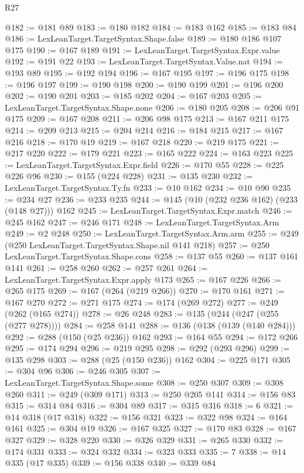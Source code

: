 \begin{lexlean}{R27}
\begin{coremodule}
@182 := @181 @89
@183 := @180 @182
@184 := @183 @162
@185 := @183 @84
@186 := LexLeanTarget.TargetSyntax.Shape.false
@189 := @180 @186 @107 @175
@190 := @167 @189
@191 := LexLeanTarget.TargetSyntax.Expr.value
@192 := @191 @22
@193 := LexLeanTarget.TargetSyntax.Value.nat
@194 := @193 @89
@195 := @192 @194
@196 := @167 @195
@197 := @196 @175
@198 := @196 @197
@199 := @190 @198
@200 := @190 @199
@201 := @196 @200
@202 := @190 @201
@203 := @185 @202
@204 := @167 @203
@205 := LexLeanTarget.TargetSyntax.Shape.none
@206 := @180 @205
@208 := @206 @91 @175
@209 := @167 @208
@211 := @206 @98 @175
@213 := @167 @211 @175
@214 := @209 @213
@215 := @204 @214
@216 := @184 @215
@217 := @167 @216
@218 := @170 @19
@219 := @167 @218
@220 := @219 @175
@221 := @217 @220
@222 := @179 @221
@223 := @165 @222
@224 := @163 @223
@225 := LexLeanTarget.TargetSyntax.Expr.field
@226 := @170 @55
@228 := @225 @226 @96
@230 := @155 (@224 @228)
@231 := @135 @230
@232 := LexLeanTarget.TargetSyntax.Ty.fn
@233 := @10 @162
@234 := @10 @90
@235 := @234 @27
@236 := @233 @235
@244 := @145 (@10 (@232 @236 @162) (@233 (@148 @27))) @162
@245 := LexLeanTarget.TargetSyntax.Expr.match
@246 := @245 @162
@247 := @246 @171
@248 := LexLeanTarget.TargetSyntax.Arm
@249 := @2 @248
@250 := LexLeanTarget.TargetSyntax.Arm.arm
@255 := @249 (@250 LexLeanTarget.TargetSyntax.Shape.nil @141 @218)
@257 := @250 LexLeanTarget.TargetSyntax.Shape.cons
@258 := @137 @55
@260 := @137 @161 @141
@261 := @258 @260
@262 := @257 @261
@264 := LexLeanTarget.TargetSyntax.Expr.apply @173
@265 := @167 @226
@266 := @265 @175
@269 := @167 (@264 (@219 @266))
@270 := @170 @161
@271 := @167 @270
@272 := @271 @175
@274 := @174 (@269 @272)
@277 := @249 (@262 (@165 @274))
@278 := @26 @248
@283 := @135 (@244 (@247 (@255 (@277 @278))))
@284 := @258 @141
@288 := @136 (@138 (@139 (@140 @284)))
@292 := @288 (@150 (@25 @236)) @162
@293 := @164 @55
@294 := @172 @266
@295 := @174 @294
@296 := @219 @295
@298 := @292 (@293 @296)
@299 := @135 @298
@303 := @288 (@25 (@150 @236)) @162
@304 := @225 @171
@305 := @304 @96
@306 := @246 @305
@307 := LexLeanTarget.TargetSyntax.Shape.some
@308 := @250 @307
@309 := @308 @260
@311 := @249 (@309 @171)
@313 := @250 @205 @141
@314 := @156 @83
@315 := @314 @84
@316 := @304 @89
@317 := @315 @316
@318 := 6
@321 := @14 @318 (@17 @318)
@322 := @156 @321
@323 := @322 @98
@324 := @164 @161
@325 := @304 @19
@326 := @167 @325
@327 := @170 @83
@328 := @167 @327
@329 := @328 @220
@330 := @326 @329
@331 := @265 @330
@332 := @174 @331
@333 := @324 @332
@334 := @323 @333
@335 := 7
@338 := @14 @335 (@17 @335)
@339 := @156 @338
@340 := @339 @84

\end{coremodule}
\end{lexlean}
